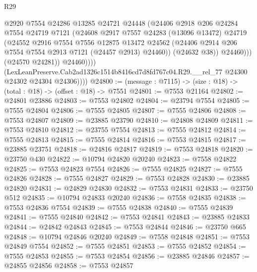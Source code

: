 \begin{lexlean}{R29}
\begin{coremodule}
                        @2920
                        @7554
                        @24286
                        @13285
                        @24721
                        @24448
                        (@24406
                          @2918
                          @206
                          @24284
                          @7554
                          @24719
                          @7121
                          (@24608
                            @2917
                            @7557
                            @24283
                            (@13096 @13472)
                            @24719
                            (@24552
                              @2916
                              @7554
                              @7556
                              @12875
                              @13472
                              @24562
                              (@24406 @2914 @206 @7554 @7554 @2913 @7121 (@24457 @2913) @24460))
                            (@24632 @38))
                          @24460)))
                    (@24570 @24281))
                  @24460))))
          (LexLeanPreserve.Cab2ad1326c1514b8416cd7d8fd767c04.R29.__rel_77
            @24300
            @24302
            @24304
            @24306))))
@24800 := (message : @7115) -> (size : @18) -> (total : @18) -> (offset : @18) -> @7551
@24801 := @7553 @21164
@24802 := @24801 @23886
@24803 := @7553 @24802
@24804 := @23794 @7554
@24805 := @7555 @24804
@24806 := @7555 @24805
@24807 := @7555 @24806
@24808 := @7553 @24807
@24809 := @23885 @23790
@24810 := @24808 @24809
@24811 := @7553 @24810
@24812 := @23755 @7554
@24813 := @7555 @24812
@24814 := @7555 @24813
@24815 := @7555 @24814
@24816 := @7553 @24815
@24817 := @23885 @23751
@24818 := @24816 @24817
@24819 := @7553 @24818
@24820 := @23750 @430
@24822 := @10794 @24820 @20240
@24823 := @7558 @24822
@24825 := @7553 @24823 @7554
@24826 := @7555 @24825
@24827 := @7555 @24826
@24828 := @7555 @24827
@24829 := @7553 @24828
@24830 := @23885 @24820
@24831 := @24829 @24830
@24832 := @7553 @24831
@24833 := @23750 @512
@24835 := @10794 @24833 @20240
@24836 := @7558 @24835
@24838 := @7553 @24836 @7554
@24839 := @7555 @24838
@24840 := @7555 @24839
@24841 := @7555 @24840
@24842 := @7553 @24841
@24843 := @23885 @24833
@24844 := @24842 @24843
@24845 := @7553 @24844
@24846 := @23750 @665
@24848 := @10794 @24846 @20240
@24849 := @7558 @24848
@24851 := @7553 @24849 @7554
@24852 := @7555 @24851
@24853 := @7555 @24852
@24854 := @7555 @24853
@24855 := @7553 @24854
@24856 := @23885 @24846
@24857 := @24855 @24856
@24858 := @7553 @24857

\end{coremodule}
\end{lexlean}
